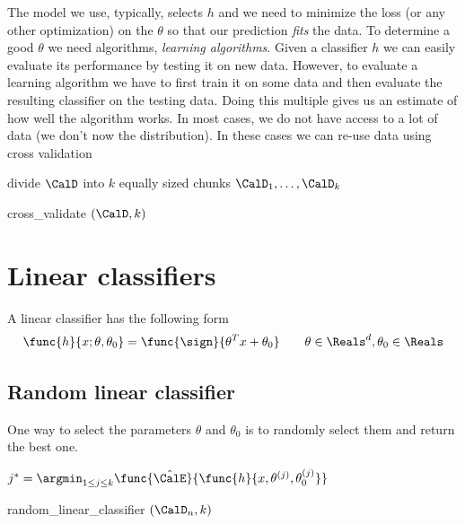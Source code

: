 The model we use, typically, selects \(h\) and we need to minimize the loss (or any other optimization) on the \(\theta\) so that our prediction \textit{fits} the data. To determine a good \(\theta\) we need algorithms, \textit{learning algorithms}. Given a classifier \(h\) we can easily evaluate its performance by testing it on new data. However, to evaluate a learning algorithm we have to first train it on some data and then evaluate the resulting classifier on the testing data. Doing this multiple gives us an estimate of how well the algorithm works. In most cases, we do not have access to a lot of data (we don't now the distribution). In these cases we can re-use data using cross validation 


\begin{algorithm}[H]
    \DontPrintSemicolon
    divide $\CalD$ into $k$ equally sized chunks  $\CalD_1 , \dots , \CalD_k$ \;
    \caption{ cross\_validate $(\CalD , k )$}
\end{algorithm}

\section{Linear classifiers}
A linear classifier has the following form
\begin{equation*}
    \func{h}{x; \theta , \theta_0} = \func{\sign}{\theta^T x + \theta_0} \qquad \theta \in \Reals^d , \theta_0 \in \Reals
\end{equation*}

\subsection{Random linear classifier}
One way to select the parameters \(\theta\) and \(\theta_0\) is to randomly select them and return the best one.

\begin{algorithm}[H]
    \DontPrintSemicolon
    $j^\ast = \argmin_{\substack{1 \leq j \leq k}} \func{\hat{\CalE}}{\func{h}{x, \theta^{(j)} , \theta^{(j)}_0}}$

    \caption{ random\_linear\_classifier $(\CalD_n , k )$}
\end{algorithm}

